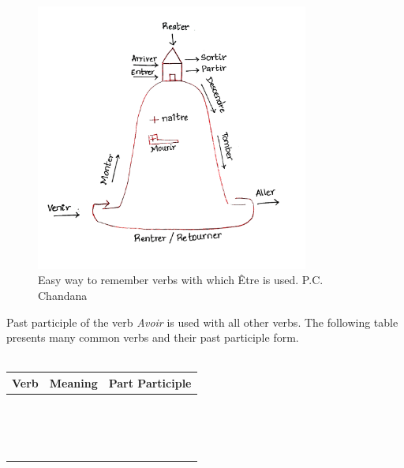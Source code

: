 \begin{figure}[!h]
\includegraphics[width=0.8\textwidth]{images/PastTense.png}
\caption{Easy way to remember verbs with which \^Etre is used. P.C. Chandana}
\label{fig:pastTenseEtreVerbs}
\end{figure}

\noindent Past participle of the verb \emph{Avoir} is used with all other verbs.
The following table presents many common verbs and their past participle form.\\\\

\begin{longtable}{| l | l | l |}
\hline
Verb            & Meaning             & Part Participle \\
\hline
\endhead
&  &  \\
\hline
&  &  \\
\hline
&  &  \\
\hline
&  &  \\
\hline
&  &  \\
\hline
&  &  \\
\hline
&  &  \\
\hline
&  &  \\
\hline
&  &  \\
\hline
&  &  \\
\hline
&  &  \\
\hline
&  &  \\
\hline
&  &  \\
\hline
&  &  \\
\hline
&  &  \\
\hline
&  &  \\
\hline
\end{longtable}


